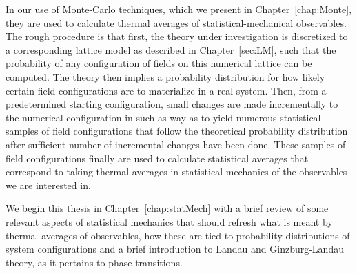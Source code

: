 In our use of Monte-Carlo techniques, which we present in Chapter~\ref{chap:Monte}, they are used
to calculate thermal averages of statistical-mechanical
observables. The rough procedure is that first, the theory under investigation is discretized to a corresponding lattice model as described in Chapter~\ref{sec:LM},
such that the probability of any configuration of fields on this numerical lattice can be computed. The theory then implies a probability distribution for how
likely certain field-configurations are to materialize in a real system.
Then, from a predetermined starting configuration, small changes are made incrementally to the numerical configuration in such
as way as to yield numerous statistical samples of field configurations that follow the theoretical probability distribution after sufficient number of
incremental changes have been done. These samples of field configurations finally are used to calculate statistical averages that correspond to taking
thermal averages in statistical mechanics of the observables we are interested in. 

We begin this thesis in Chapter~\ref{chap:statMech} with a brief review
of some relevant aspects of statistical mechanics that should refresh what is meant by thermal averages of observables, how these are tied to probability
distributions of system configurations and a brief introduction to Landau and Ginzburg-Landau theory, as it pertains to phase transitions.

